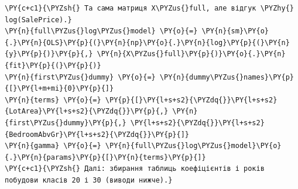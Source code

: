 \begin{Verbatim}[commandchars=\\\{\}]
\PY{c+c1}{\PYZsh{} Та сама матриця X\PYZus{}full, але відгук \PYZhy{} log(SalePrice).}
\PY{n}{full\PYZus{}log\PYZus{}model} \PY{o}{=} \PY{n}{sm}\PY{o}{.}\PY{n}{OLS}\PY{p}{(}\PY{n}{np}\PY{o}{.}\PY{n}{log}\PY{p}{(}\PY{n}{y}\PY{p}{)}\PY{p}{,} \PY{n}{X\PYZus{}full}\PY{p}{)}\PY{o}{.}\PY{n}{fit}\PY{p}{(}\PY{p}{)}
\PY{n}{first\PYZus{}dummy} \PY{o}{=} \PY{n}{dummy\PYZus{}names}\PY{p}{[}\PY{l+m+mi}{0}\PY{p}{]}
\PY{n}{terms} \PY{o}{=} \PY{p}{[}\PY{l+s+s2}{\PYZdq{}}\PY{l+s+s2}{LotArea}\PY{l+s+s2}{\PYZdq{}}\PY{p}{,} \PY{n}{first\PYZus{}dummy}\PY{p}{,} \PY{l+s+s2}{\PYZdq{}}\PY{l+s+s2}{BedroomAbvGr}\PY{l+s+s2}{\PYZdq{}}\PY{p}{]}
\PY{n}{gamma} \PY{o}{=} \PY{n}{full\PYZus{}log\PYZus{}model}\PY{o}{.}\PY{n}{params}\PY{p}{[}\PY{n}{terms}\PY{p}{]}
\PY{c+c1}{\PYZsh{} Далі: збирання таблиць коефіцієнтів і років побудови класів 20 і 30 (виводи нижче).}
\end{Verbatim}
